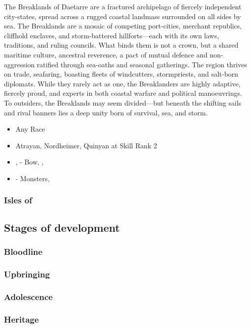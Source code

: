 \documentclass[12pt]{article}
\begin{document}
The Breaklands of Daetarre are a fractured archipelago of fiercely independent city-states, spread across a rugged coastal landmass surrounded on all sides by sea. The Breaklands are a mosaic of competing port-cities, merchant republics, cliffhold enclaves, and storm-battered hillforts—each with its own laws, traditions, and ruling councils. What binds them is not a crown, but a shared maritime culture, ancestral reverence, a pact of mutual defence and non-aggression ratified through sea-oaths and seasonal gatherings. The region thrives on trade, seafaring, boasting fleets of windcutters, stormpriests, and salt-born diplomats. While they rarely act as one, the Breaklanders are highly adaptive, fiercely proud, and experts in both coastal warfare and political manoeuvrings. To outsiders, the Breaklands may seem divided—but beneath the shifting sails and rival banners lies a deep unity born of survival, sea, and storm.
\begin{itemize}
\item Any Race
\item Atrayan, Nordheimer, Quinyan at Skill Rank 2
\item {},  - Bow, , 
\item {} - Monsters, 
\end{itemize}
\newpage
\subsubsection{Isles of }
\newpage
\subsection{Stages of development}
\subsubsection{Bloodline}
\subsubsection{Upbringing}
\subsubsection{Adolescence}
\subsubsection{Heritage}
\end{document}
